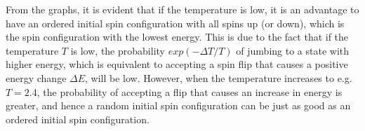 From the graphs, it is evident that if the temperature is low, it is an advantage to have an ordered initial spin configuration with all spins up (or down), which is the spin configuration with the lowest energy.
This is due to the fact that if the temperature $T$ is low, the probability $exp(-\Delta T/T)$ of jumbing to a state with higher energy, which is equivalent to accepting a spin flip that causes a positive energy change $\Delta E$, will be low.
However, when the temperature increases to e.g. $T = 2.4$, the probability of accepting a flip that causes an increase in energy is greater, and hence a random initial spin configuration can be just as good as an ordered initial spin configuration.  